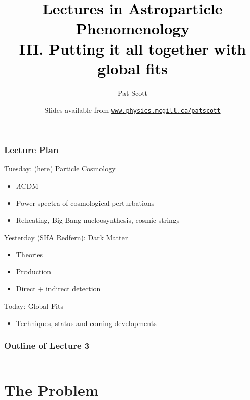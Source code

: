 \documentclass[xcolor=dvipsnames]{beamer}
\title[{\color[rgb]{0, 0, 0}Astroparticle Phenomenology III: Global Fits}]{\textcolor{black}{Lectures in Astroparticle Phenomenology\\ III. Putting it all together with global fits}}
\author[Pat Scott -- Feb 27 -- University of Sydney]{Pat Scott}
\institute{\small{McGill University / Imperial College London}}
\date[Feb 27, 2014]{Slides available from \color[rgb]{0.1, 0.0, 0.6} \href{http://www.physics.mcgill.ca/~patscott}{\tt www.physics.mcgill.ca/{\urltilda}patscott}}
\newcommand{\cblue}[1]{{\color[rgb]{0.1, 0.0, 0.6} #1}}
\begin{document}
\maketitle


\begin{frame}
  \frametitle{Lecture Plan}

  \cblue{Tuesday}: (here) Particle Cosmology
  \begin{itemize}
    \item $\Lambda$CDM
    \item Power spectra of cosmological perturbations
    \item Reheating, Big Bang nucleosynthesis, cosmic strings
  \end{itemize}
  \vspace{3mm}

  \cblue{Yesterday} (SIfA Redfern):  Dark Matter
  \begin{itemize}
    \item Theories
    \item Production
    \item Direct + indirect detection
  \end{itemize}
  \vspace{3mm}

  \cblue{Today}:  Global Fits
  \begin{itemize}
    \item Techniques, status and coming developments
  \end{itemize}
    
\end{frame}


\begin{frame}
  \frametitle{Outline of Lecture 3}
  \begin{columns}[t]
	\tableofcontents[sections={1}]
        \vspace{3mm}
	\tableofcontents[sections={2}]
        \vspace{3mm}
	\tableofcontents[sections={3}]
  \end{columns}	
\end{frame}

\section{The Problem}
\end{document}
